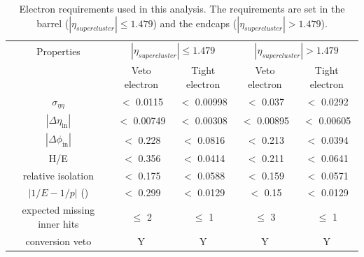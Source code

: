 \begin{table}[htbp]
	\centering
	
	\caption{Electron requirements used in this analysis. The requirements are set in the barrel ($|\eta_{supercluster}| \leq 1.479$)
		and the endcaps ($|\eta_{supercluster}| > 1.479$). }
	\begin{tabular}{ccccc}
		\toprule
		Properties & \multicolumn{2}{c}{$|\eta_{supercluster}| \leq 1.479$ } & \multicolumn{2}{c}{$|\eta_{supercluster}| > 1.479$ } \\
		
		& Veto electron & Tight electron & Veto electron & Tight electron \\ 
	  \midrule
		$ \sigma_{\eta \eta}$ & $<$ 0.0115 & $<$ 0.00998 & $<$ 0.037 & $<$ 0.0292 \\ 
	
		$|\Delta \eta_{\mathrm{in}}|$ & $<$ 0.00749 & $<$ 0.00308 & $<$ 0.00895& $<$ 0.00605\\ 
	 
		$|\Delta \phi_{\mathrm{in}}|$ & $<$ 0.228 & $<$ 0.0816 & $<$ 0.213& $<$ 0.0394 \\ 
		
		H/E & $<$ 0.356 & $<$ 0.0414 & $<$ 0.211& $<$ 0.0641 \\ 
		
		relative isolation & $<$ 0.175 & $<$ 0.0588  & $<$ 0.159& $<$ 0.0571\\ 
	
		$|1/E-1/p|$ (\GeVinv) & $<$ 0.299 & $<$ 0.0129 & $<$ 0.15 &$<$ 0.0129 \\ 
	
		expected missing inner hits & $\leq $ 2 & $\leq $ 1 &  $\leq $ 3 &  $\leq $ 1\\ 
		
		 conversion veto & Y & Y & Y & Y\\ 
		\bottomrule
	\end{tabular} 
	\label{tab:ElecReq}
\end{table}


